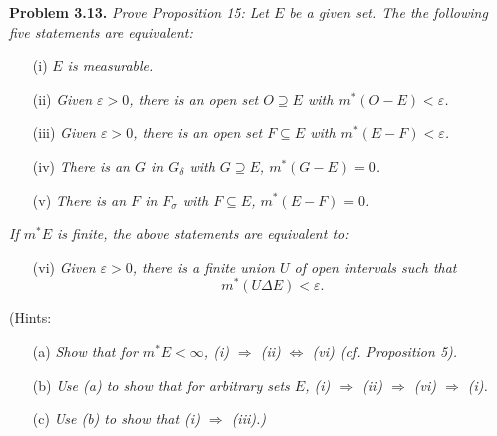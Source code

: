 \documentclass{article}
\begin{document}
\textbf{Problem 3.13.}
\emph{Prove Proposition 15: Let $E$ be a given set.
The the following five statements are equivalent:}
\begin{enumerate}
\item[(i)]
  \emph{$E$ is measurable.}

\item[(ii)]
  \emph{Given $\varepsilon > 0$, there is an open set $O \supseteq E$ with
  $m^{*}(O - E) < \varepsilon$.}

\item[(iii)]
  \emph{Given $\varepsilon > 0$, there is an open set $F \subseteq E$ with
  $m^{*}(E - F) < \varepsilon$.}

\item[(iv)]
  \emph{There is an $G$ in $G_{\delta}$ with $G \supseteq E$, $m^{*}(G - E) = 0$.}

\item[(v)]
  \emph{There is an $F$ in $F_{\sigma}$ with $F \subseteq E$, $m^{*}(E - F) = 0$.}
\end{enumerate}
\emph{If $m^{*}E$ is finite, the above statements are equivalent to:}
\begin{enumerate}
\item[(vi)]
  \emph{Given $\varepsilon > 0$, there is a finite union $U$ of open intervals
  such that}
  \[
    m^{*}(U \Delta E) < \varepsilon.
  \]
\end{enumerate}
(Hints:
\begin{enumerate}
\item[(a)]
  \emph{Show that for $m^{*}E < \infty$,
  (i) $\Rightarrow$ (ii) $\Leftrightarrow$ (vi) (cf. Proposition 5).}

\item[(b)]
  \emph{Use (a) to show that for arbitrary sets $E$,
  (i) $\Rightarrow$ (ii) $\Rightarrow$ (vi) $\Rightarrow$ (i).}

\item[(c)]
  \emph{Use (b) to show that (i) $\Rightarrow$ (iii).)} \\
\end{enumerate}
\end{document}
